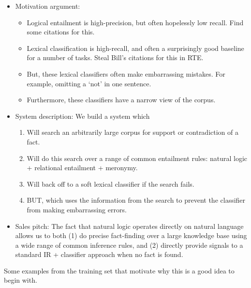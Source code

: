 \newpage
{}
\begin{itemize}

\item Motivation argument:
  \begin{itemize}
    \item Logical entailment is high-precision, but often hopelessly low recall.
          Find some citations for this.
    \item Lexical classification is high-recall, and often a surprisingly good baseline
          for a number of tasks.
          Steal Bill's citations for this in RTE.
    \item But, these lexical classifiers often make embarrassing mistakes.
          For example, omitting a `not' in one sentence.
    \item Furthermore, these classifiers have a narrow view of the corpus.
  \end{itemize}

\item System description: We build a system which
  \begin{enumerate}
    \item Will search an arbitrarily large corpus for support or contradiction of
          a fact.
    \item Will do this search over a range of common entailment rules: natural
          logic + relational entailment + meronymy.
    \item Will back off to a soft lexical classifier if the search fails.
    \item BUT, which uses the information from the search to prevent the
          classifier from making embarrassing errors.
  \end{enumerate}

\item Sales pitch:
  The fact that natural logic operates directly on natural language allows us
  to both (1) do precise fact-finding over a large knowledge base using a
  wide range of common inference rules, and (2) directly provide signals to
  a standard IR + classifier approach when no fact is found.
\end{itemize}

Some examples from the training set that motivate why this is a good idea to begin
with.


